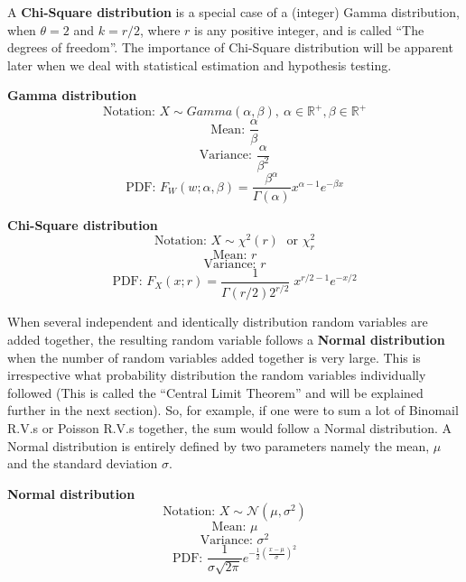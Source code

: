 A \textbf{Chi-Square distribution} is a special case of a (integer) Gamma distribution, when $\theta = 2$ and $k = r/2$, where $r$ is any positive integer, and is called ``The degrees of freedom''. The importance of Chi-Square distribution will be apparent later when we deal with statistical estimation and hypothesis testing.

	\begin{highlightedText}
		\textbf{Gamma  distribution} 
		\[ \text{Notation: }  X \sim Gamma(\alpha, \beta),\ \alpha \in \mathbb{R}^+, \beta \in \mathbb{R}^+ \] 			
		\[ \text{Mean: } \frac{\alpha}{\beta} \] 						
		\[ \text{Variance: } \frac{\alpha}{\beta^2}\] 						
		\[ \text{PDF: } F_W(w;\alpha,\beta) = \frac{\beta^\alpha}{\Gamma(\alpha)} x^{\alpha - 1} e^{-\beta x} \] 
		
		\textbf{Chi-Square distribution}
		\[ \text{Notation: }  X \sim \chi^2(r)\;\text{ or }\chi^2_r \]
		\[ \text{Mean: } r \]
		\[ \text{Variance: } r \]
		\[ \text{PDF: } F_X(x;r) = \frac{1}{\Gamma(r/2) 2^{r/2}}\; x^{r/2-1} e^{-x/2} \]
	\end{highlightedText}
	
When several independent and identically distribution random variables are added together, the resulting random variable follows a \textbf{Normal distribution} when the number of random variables added together is very large. This is irrespective what probability distribution the random variables individually followed (This is called the ``Central Limit Theorem'' and will be explained further in the next section). So, for example, if one were to sum a lot of Binomail R.V.s or Poisson R.V.s together, the sum would follow a Normal distribution. A Normal distribution is entirely defined by two parameters namely the mean, $\mu$ and the standard deviation $\sigma$.
	\begin{highlightedText}
	\textbf{Normal distribution} 
	\[ \text{Notation: } X \sim \mathcal{N}(\mu,\sigma^2) \]
	\[ \text{Mean: } \mu \]
	\[ \text{Variance: } \sigma^2 \]
	\[ \text{PDF: } \frac{1}{\sigma\sqrt{2\pi}} e^{-\frac{1}{2}\left(\frac{x - \mu}{\sigma}\right)^2} \]
	\end{highlightedText}

